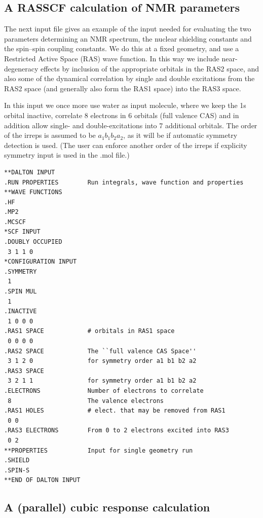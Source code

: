 \subsection{A RASSCF calculation of NMR parameters}

The next input file gives an example of the input needed for
evaluating the two parameters determining an NMR spectrum, the nuclear
shielding constants and the spin--spin
coupling constants. We do this
at a fixed geometry, and use a Restricted Active Space (RAS) wave
function. In this way we include near-degeneracy effects by inclusion
of the appropriate orbitals in the RAS2 space, and also some of the
dynamical correlation  by single and
double excitations
from the RAS2 space (and generally also form the RAS1 space) into the
RAS3 space.

In this input we once more use water as input molecule,
where we keep
the 1s orbital inactive, correlate 8 electrons in 6 orbitals (full valence
CAS) and in addition allow single- and double-excitations into
7 additional orbitals.
The order of the irreps is assumed to be $a_1 b_1 b_2 a_2$, as it will be if automatic symmetry detection is used.
(The user can enforce another order of the irreps if explicity symmetry input is used in the .mol file.)

\begin{verbatim}
**DALTON INPUT
.RUN PROPERTIES        Run integrals, wave function and properties
**WAVE FUNCTIONS
.HF
.MP2
.MCSCF
*SCF INPUT
.DOUBLY OCCUPIED
 3 1 1 0
*CONFIGURATION INPUT
.SYMMETRY
 1
.SPIN MUL
 1
.INACTIVE
 1 0 0 0
.RAS1 SPACE            # orbitals in RAS1 space
 0 0 0 0
.RAS2 SPACE            The ``full valence CAS Space''
 3 1 2 0               for symmetry order a1 b1 b2 a2
.RAS3 SPACE
 3 2 1 1               for symmetry order a1 b1 b2 a2
.ELECTRONS             Number of electrons to correlate
 8                     The valence electrons
.RAS1 HOLES            # elect. that may be removed from RAS1
 0 0
.RAS3 ELECTRONS        From 0 to 2 electrons excited into RAS3
 0 2
**PROPERTIES           Input for single geometry run
.SHIELD
.SPIN-S
**END OF DALTON INPUT
\end{verbatim}

\subsection{A (parallel) cubic response calculation}

